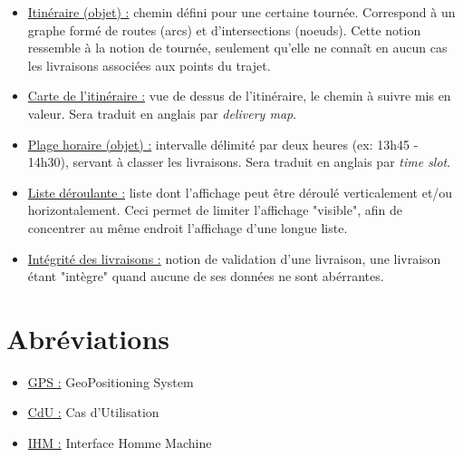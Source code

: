 \documentclass[a4paper]{report}
\begin{document}
\begin{appendices}
\begin{itemize}[label = \textbullet, font = \color{orange}]
        \item \underline{Itinéraire (objet) :} chemin défini pour une certaine
            tournée. Correspond à un graphe formé de routes (arcs) et
            d'intersections (noeuds). Cette notion ressemble à la notion de
            tournée, seulement qu'elle ne connaît en aucun cas les livraisons
            associées aux points du trajet.
        \item \underline{Carte de l'itinéraire :} vue de dessus de
            l'itinéraire, le chemin à suivre mis en valeur. Sera traduit en
            anglais par \emph{delivery map}.
        \item \underline{Plage horaire (objet) :} intervalle délimité par deux
            heures (ex: 13h45 - 14h30), servant à classer les livraisons. Sera
            traduit en anglais par \emph{time slot}.
        \item \underline{Liste déroulante :} liste dont l'affichage peut être
            déroulé verticalement et/ou horizontalement. Ceci permet de limiter
            l'affichage "visible", afin de concentrer au même endroit
            l'affichage d'une longue liste.
        \item \underline{Intégrité des livraisons :} notion de validation d'une
            livraison, une livraison étant "intègre" quand aucune de ses
            données ne sont abérrantes.
    \end{itemize}

    \chapter{Abréviations}
    \begin{itemize}[label = \textbullet, font = \color{orange}]
        \item \underline{GPS :} GeoPositioning System
        \item \underline{CdU :} Cas d'Utilisation
        \item \underline{IHM :} Interface Homme Machine
    \end{itemize}
\end{appendices}
\end{document}

